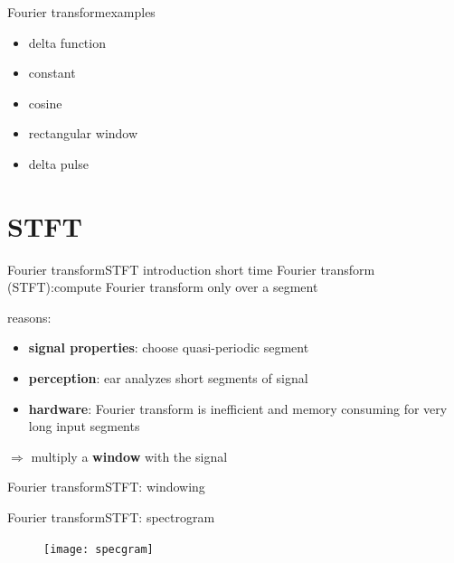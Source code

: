 	\begin{frame}{Fourier transform}{examples}
			\begin{itemize}
				\item	delta function
				\item	constant
				\item	cosine
				\item	rectangular window
				\item	delta pulse
			\end{itemize}
	\end{frame}	


\section{STFT}
	\begin{frame}{Fourier transform}{STFT introduction}
		short time Fourier transform (STFT):\linebreak compute Fourier transform only over a segment

		\vspace{3mm}		
		\pause
		reasons:
		\begin{itemize}
			\item	\textbf{signal properties}: choose quasi-periodic segment
			\item	\textbf{perception}: ear analyzes short segments of signal
			\item	\textbf{hardware}: Fourier transform is inefficient and memory consuming for very long input segments
		\end{itemize}
		\pause
        \bigskip
		$\Rightarrow$ multiply a \textbf{window} with the signal
	\end{frame}	

	\begin{frame}{Fourier transform}{STFT: windowing}
        \begin{center}
        \end{center}
	\end{frame}	
    
	\begin{frame}{Fourier transform}{STFT: spectrogram}
		\begin{figure}
			\centering
				\texttt{[image: specgram]}
		\end{figure}
        \vspace{-5mm}
	\end{frame}	

